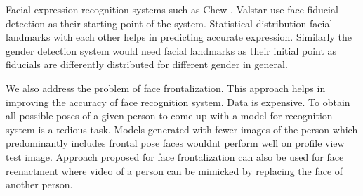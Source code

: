 Facial expression recognition systems such as Chew \etal \cite{conf/fgr/ChewLLSCS11}, Valstar \etal \cite{Valstar:2006:FAF:1153172.1153856} 
use face fiducial detection as their starting point of the system. Statistical distribution facial 
landmarks with each other helps in predicting accurate expression. Similarly the gender detection system 
would need facial landmarks as their initial point as fiducials are differently distributed 
for different gender in general.


We also address the problem of face frontalization. This approach helps in improving the accuracy of 
face recognition system. Data is expensive. To obtain all possible poses of a given person to 
come up with a model for recognition system is a tedious task. Models generated with fewer images
of the person which predominantly includes frontal pose faces wouldn\textquotesingle t perform well on profile
view test image. Approach proposed for face frontalization can also be used for face reenactment where 
video of a person can be mimicked by replacing the face of another person.
